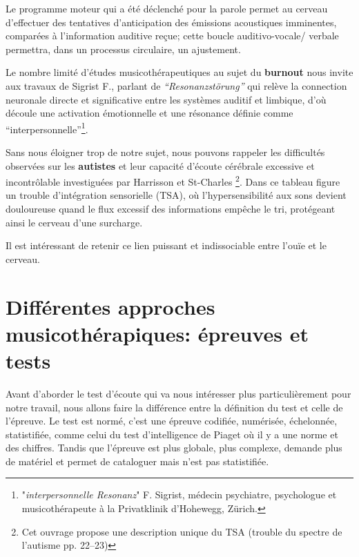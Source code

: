 Le programme moteur qui a été déclenché
pour la parole permet au cerveau d'effectuer des tentatives d'anticipation
des émissions acoustiques imminentes, comparées à l'information
auditive reçue; cette boucle
auditivo-vocale/ verbale permettra, dans un processus circulaire, un ajustement.


Le nombre limité d'études musicothérapeutiques au sujet du \textbf{burnout}
nous invite aux travaux de Sigrist F., \autocite[pp.55--90] {sigrist_burnout_2016} parlant de
\textit{``Resonanzstörung''} qui relève la connection neuronale directe et significative entre les systèmes auditif et
         limbique, d'où découle une activation émotionnelle et une
         résonance définie comme
         ``interpersonnelle''\footnote{"\textit{interpersonnelle
             Resonanz}" F. Sigrist, médecin
psychiatre, psychologue et musicothérapeute à la Privatklinik
d'Hohewegg, Zürich.}.



Sans nous éloigner trop de notre sujet, nous pouvons rappeler
les difficultés observées sur les
\textbf{autistes} et leur capacité d'écoute cérébrale excessive et
incontrôlable investiguées par Harrisson et St-Charles
\autocite {harrisson_autisme_2017} \footnote{Cet ouvrage propose une description unique du TSA
   (trouble du spectre de l'autisme
   pp. 22--23)}. Dans ce tableau
 figure un trouble d'intégration sensorielle (TSA), où
 l'hypersensibilité aux sons devient douloureuse quand le flux excessif
 des
 informations empêche le tri,  protégeant ainsi le cerveau d'une surcharge.

Il est intéressant de retenir ce lien puissant et indissociable  entre l'ouïe et le cerveau.








\chapter{Différentes approches musicothérapiques: épreuves
  et tests}
Avant d'aborder le test d'écoute qui va nous intéresser plus
particulièrement pour notre travail, nous allons faire la différence
entre la définition du test et celle de l'épreuve.
Le test est normé, c'est une épreuve codifiée, numérisée, échelonnée,
statistifiée, comme celui du test d'intelligence de Piaget où il y a une
norme et des chiffres. Tandis que l'épreuve est plus globale, plus complexe,
demande plus de matériel et permet de
cataloguer mais n'est pas statistifiée.


